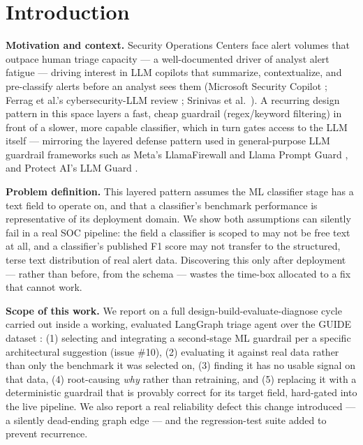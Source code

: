 \documentclass[twocolumn]{svjour3}
\begin{document}
\section{Introduction}\label{sec1}

\noindent\textbf{Motivation and context.} Security Operations Centers face alert volumes that outpace human triage capacity --- a well-documented driver of analyst alert fatigue \cite{alert_fatigue_survey2026} --- driving interest in LLM copilots that summarize, contextualize, and pre-classify alerts before an analyst sees them (Microsoft Security Copilot \cite{msft_copilot2024}; Ferrag et al.'s cybersecurity-LLM review \cite{ferrag2024}; Srinivas et al.\ \cite{srinivas2025survey}). A recurring design pattern in this space layers a fast, cheap guardrail (regex/keyword filtering) in front of a slower, more capable classifier, which in turn gates access to the LLM itself --- mirroring the layered defense pattern used in general-purpose LLM guardrail frameworks such as Meta's LlamaFirewall \cite{llamafirewall2025} and Llama Prompt Guard \cite{promptguard2024}, and Protect AI's LLM Guard \cite{llmguard2023}.

\noindent\textbf{Problem definition.} This layered pattern assumes the ML classifier stage has a text field to operate on, and that a classifier's benchmark performance is representative of its deployment domain. We show both assumptions can silently fail in a real SOC pipeline: the field a classifier is scoped to may not be free text at all, and a classifier's published F1 score may not transfer to the structured, terse text distribution of real alert data. Discovering this only after deployment --- rather than before, from the schema --- wastes the time-box allocated to a fix that cannot work.

\noindent\textbf{Scope of this work.} We report on a full design-build-evaluate-diagnose cycle carried out inside a working, evaluated LangGraph triage agent over the GUIDE dataset \cite{guide2024}: (1) selecting and integrating a second-stage ML guardrail per a specific architectural suggestion (issue \#10), (2) evaluating it against real data rather than only the benchmark it was selected on, (3) finding it has no usable signal on that data, (4) root-causing \emph{why} rather than retraining, and (5) replacing it with a deterministic guardrail that is provably correct for its target field, hard-gated into the live pipeline. We also report a real reliability defect this change introduced --- a silently dead-ending graph edge --- and the regression-test suite added to prevent recurrence.
\end{document}
